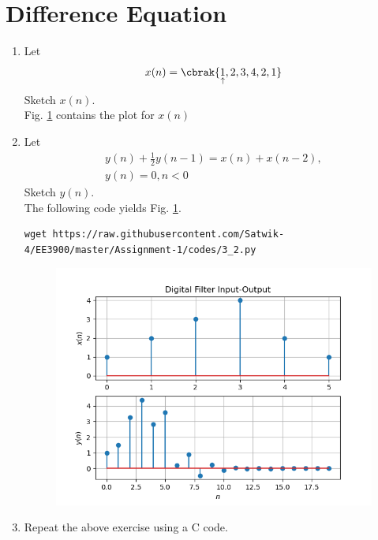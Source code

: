 \documentclass[journal,12pt,twocolumn]{IEEEtran}
\renewcommand\thesection{\arabic{section}}
\begin{document}
\section{Difference Equation}
\begin{enumerate}[label=\thesection.\arabic*,ref=\thesection.\theenumi]
\item Let \label{def:xn}
\begin{equation}
x(n) = \cbrak{\underset{\uparrow}{1},2,3,4,2,1}\label{eq:xn}
\end{equation}
Sketch $x(n)$.\\
\solution Fig. \ref{fig:xnyn} contains the plot for $x(n)$
\item Let
\begin{multline}
\label{eq:iir_filter}
y(n) + \frac{1}{2}y(n-1) = x(n) + x(n-2), 
\\
 y(n) = 0, n < 0
\end{multline}
Sketch $y(n)$.
\\
\solution The following code yields Fig. \ref{fig:xnyn}.
\begin{lstlisting}
wget https://raw.githubusercontent.com/Satwik-4/EE3900/master/Assignment-1/codes/3_2.py
\end{lstlisting}
\begin{figure}[!ht]
\begin{center}
\includegraphics[width=\columnwidth]{figures/Figure_1.png}
\end{center}
\label{fig:xnyn}	
\end{figure}
\item Repeat the above exercise using a C code.\\
\solution


\end{enumerate}
\end{document}

